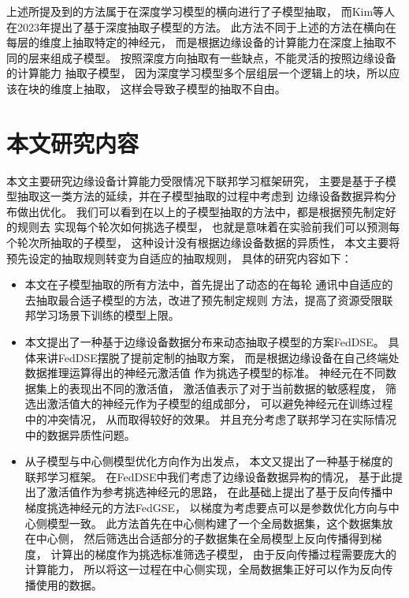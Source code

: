 上述所提及到的方法属于在深度学习模型的横向进行了子模型抽取，
而Kim等人在2023年提出了基于深度抽取子模型的方法\cite{kim2023depthfl}。
此方法不同于上述的方法在横向在每层的维度上抽取特定的神经元，
而是根据边缘设备的计算能力在深度上抽取不同的层来组成子模型。
按照深度方向抽取有一些缺点，不能灵活的按照边缘设备的计算能力
抽取子模型，
因为深度学习模型多个层组层一个逻辑上的块，所以应该在块的维度上抽取，
这样会导致子模型的抽取不自由。



\section{本文研究内容}
本文主要研究边缘设备计算能力受限情况下联邦学习框架研究，
主要是基于子模型抽取这一类方法的延续，并在子模型抽取的过程中考虑到
边缘设备数据异构分布做出优化。
我们可以看到在以上的子模型抽取的方法中，都是根据预先制定好的规则去
实现每个轮次如何挑选子模型，
也就是意味着在实验前我们可以预测每个轮次所抽取的子模型，
这种设计没有根据边缘设备数据的异质性，
本文主要将预先设定的抽取规则转变为自适应的抽取规则，
具体的研究内容如下：
\begin{itemize}
    \item 本文在子模型抽取的所有方法中，首先提出了动态的在每轮
    通讯中自适应的去抽取最合适子模型的方法，改进了预先制定规则
    方法，提高了资源受限联邦学习场景下训练的模型上限。

    \item 本文提出了一种基于边缘设备数据分布来动态抽取子模型的方案FedDSE。
    具体来讲FedDSE摆脱了提前定制的抽取方案，
    而是根据边缘设备在自己终端处数据推理运算得出的神经元激活值
    作为挑选子模型的标准。
    神经元在不同数据集上的表现出不同的激活值，
    激活值表示了对于当前数据的敏感程度，
    筛选出激活值大的神经元作为子模型的组成部分，
    可以避免神经元在训练过程中的冲突情况，
    从而取得较好的效果。
    并且充分考虑了联邦学习在实际情况中的数据异质性问题。

    \item 从子模型与中心侧模型优化方向作为出发点，
    本文又提出了一种基于梯度的联邦学习框架。
    在FedDSE中我们考虑了边缘设备数据异构的情况，
    基于此提出了激活值作为参考挑选神经元的思路，
    在此基础上提出了基于反向传播中梯度挑选神经元的方法FedGSE，
    以梯度为考虑要点可以是参数优化方向与中心侧模型一致。
    此方法首先在中心侧构建了一个全局数据集，这个数据集放在中心侧，
    然后筛选出合适部分的子数据集在全局模型上反向传播得到梯度，
    计算出的梯度作为挑选标准筛选子模型，
    由于反向传播过程需要庞大的计算能力，
    所以将这一过程在中心侧实现，全局数据集正好可以作为反向传播使用的数据。
    
\end{itemize}

